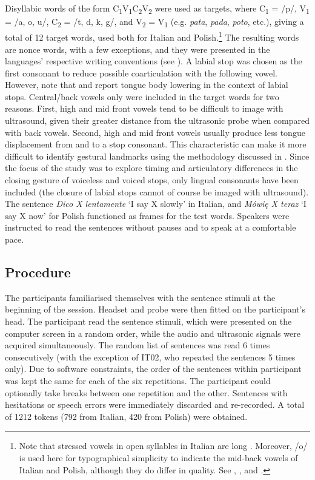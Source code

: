 \documentclass[preprint]{JASAnew}
\begin{document}
Disyllabic words of the form
C\textsubscript{1}V\textsubscript{1}C\textsubscript{2}V\textsubscript{2}
were used as targets, where C\textsubscript{1} = /p/, V\textsubscript{1}
= /a, o, u/, C\textsubscript{2} = /t, d, k, g/, and V\textsubscript{2} =
V\textsubscript{1} (e.g. \emph{pata}, \emph{pada}, \emph{poto}, etc.),
giving a total of 12 target words, used both for Italian and
Polish.\footnote{Note that stressed vowels in open syllables in Italian are long \citep{renwick2016}. Moreover, /o/ is used here for typographical simplicity to indicate the mid-back vowels of Italian and Polish, although they do differ in quality. See \citet{kramer2009}, \citet{renwick2016}, and \citet{gussmann2007}.}
The resulting words are nonce words, with a few exceptions, and they
were presented in the languages' respective writing conventions (see
). A labial stop was chosen as the first consonant to
reduce possible coarticulation with the following vowel. However, note
that \citet{westbury1983} and \citet{vazquez-alvarez2007} report tongue
body lowering in the context of labial stops. Central/back vowels only
were included in the target words for two reasons. First, high and mid
front vowels tend to be difficult to image with ultrasound, given their
greater distance from the ultrasonic probe when compared with back
vowels. Second, high and mid front vowels usually produce less tongue
displacement from and to a stop consonant. This characteristic can make
it more difficult to identify gestural landmarks using the methodology
discussed in . Since the focus of the study was to
explore timing and articulatory differences in the closing gesture of
voiceless and voiced stops, only lingual consonants have been included
(the closure of labial stops cannot of course be imaged with
ultrasound). The sentence \emph{Dico X lentamente} `I say X slowly' in
Italian, and \emph{Mówię X teraz} `I say X now' for Polish functioned as
frames for the test words. Speakers were instructed to read the
sentences without pauses and to speak at a comfortable pace.

\hypertarget{procedure}{%
\subsection{Procedure}\label{procedure}}

The participants familiarised themselves with the sentence stimuli at
the beginning of the session. Headset and probe were then fitted on the
participant's head. The participant read the sentence stimuli, which
were presented on the computer screen in a random order, while the audio
and ultrasonic signals were acquired simultaneously. The random list of
sentences was read 6 times consecutively (with the exception of IT02,
who repeated the sentences 5 times only). Due to software constraints,
the order of the sentences within participant was kept the same for each
of the six repetitions. The participant could optionally take breaks
between one repetition and the other. Sentences with hesitations or
speech errors were immediately discarded and re-recorded. A total of
1212 tokens (792 from Italian, 420 from Polish) were obtained.
\end{document}
